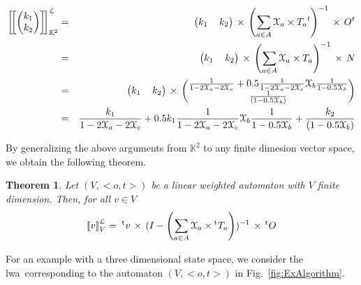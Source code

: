 \documentclass[3p]{elsarticle}
\newcommand{\X}{\mathcal{X}}           %
\newcommand{\fL}{\mathcal{L}}    %
\newcommand{\streamproduct}{\times} %
\newcommand{\beh}[3]{\left[\!\left[ #1 \right]\!\right]^{#2}_{#3}} %
\newcommand{\transp}{{}^{\mathrm{t}}}  %
\newcommand{\K}{\mathbb{K}}            %
\newcommand{\lwa}{{\sc lwa}}           %
\newtheorem{theorem}{Theorem}
\begin{document}
\begin{eqnarray*}
\beh{ \begin{pmatrix} k_1  \\  k_2
\end{pmatrix}}{\fL}{\K^2} & = &
\begin{pmatrix}
k_1 \,  & k_2
\end{pmatrix}
\, \streamproduct \, \left(\sum_{a\in A} \Xa \streamproduct
{T_a}^t\right)^{-1} \, \streamproduct \, O^t
\\
& = &
\begin{pmatrix}
k_1 \,  & k_2
\end{pmatrix}
\, \streamproduct \, \left(\sum_{a\in A} \Xa \streamproduct
{T_a}\right)^{-1} \, \streamproduct \, N
\\
& = &
\begin{pmatrix}
k_1 \,  & k_2
\end{pmatrix}
\, \streamproduct \,
\begin{pmatrix}
\frac{1}{1-2\Xa-2\X_c} +0.5 \frac 1 {1-2\Xa-2\X_c} \Xb\frac 1 {1-0.5\Xb} \\
\frac{1}{(1-0.5\Xb)}
\end{pmatrix}
\\
& = & \frac{k_1}{1-2\Xa-2\X_c} +0.5 k_1\frac 1 {1-2\Xa-2\X_c}
\Xb\frac 1 {1-0.5\Xb} + \frac{k_2}{(1-0.5\Xb)} \end{eqnarray*}

By generalizing the above arguments from $\K^2$ to any finite dimesion vector space, we obtain the following theorem.

\begin{theorem}\label{thm:rational}
Let $(V, <o,t>)$ be a linear weighted automaton with $V$ finite dimension. Then, for all $v \in V$
\[
\beh{v}{\fL}{V} = \;
\transp{v}
\, \streamproduct \, (I - \left(\sum_{a\in A} \Xa \streamproduct
\transp{T_{a}}\right))^{-1} \, \streamproduct \, \transp{O}
\]
\end{theorem}


For an example with a three dimensional state
space, we consider the \lwa\ corresponding to the automaton $(V,<o,t>)$
in Fig.~\ref{fig:ExAlgorithm}.
\end{document}
